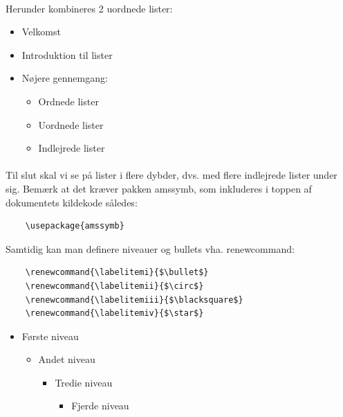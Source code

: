 \documentclass{article}
\renewcommand{\labelitemi}{$\bullet$}
\renewcommand{\labelitemii}{$\circ$}
\renewcommand{\labelitemiii}{$\blacksquare$}
\renewcommand{\labelitemiv}{$\star$}
\begin{document}
\paragraph{}
Herunder kombineres 2 uordnede lister:
\begin{itemize}
    \item Velkomst
    \item Introduktion til lister
    \item Nøjere gennemgang:
    \begin{itemize}
        \item Ordnede lister
        \item Uordnede lister
        \item Indlejrede lister
    \end{itemize}
\end{itemize}
\paragraph{}
Til slut skal vi se på lister i flere dybder, dvs. med flere indlejrede lister under sig. Bemærk at det kræver pakken amssymb, som inkluderes i toppen af dokumentets kildekode således:
\begin{verbatim}
    \usepackage{amssymb}
\end{verbatim} 
Samtidig kan man definere niveauer og bullets vha. renewcommand:
\begin{verbatim}
    \renewcommand{\labelitemi}{$\bullet$}
    \renewcommand{\labelitemii}{$\circ$}
    \renewcommand{\labelitemiii}{$\blacksquare$}
    \renewcommand{\labelitemiv}{$\star$}
\end{verbatim}
\begin{itemize}
    \item Første niveau
    \begin{itemize}
        \item Andet niveau
        \begin{itemize}
            \item Tredie niveau
            \begin{itemize}
                \item Fjerde niveau
            \end{itemize}
        \end{itemize}
    \end{itemize}
\end{itemize}
\end{document}
